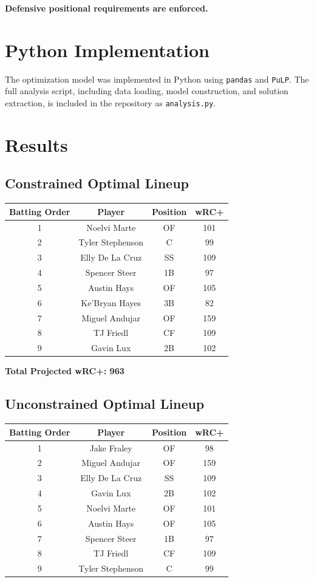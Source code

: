 \documentclass[12pt]{article}
\begin{document}
\textbf{Defensive positional requirements are enforced.}

\section{Python Implementation}

The optimization model was implemented in Python using \texttt{pandas} and \texttt{PuLP}. The full analysis script, including data loading, model construction, and solution extraction, is included in the repository as \texttt{analysis.py}.

\section{Results}

\subsection*{Constrained Optimal Lineup}

\begin{longtable}{cccc}
\toprule
Batting Order & Player & Position & wRC+ \\
\midrule
1 & Noelvi Marte & OF & 101 \\
2 & Tyler Stephenson & C & 99 \\
3 & Elly De La Cruz & SS & 109 \\
4 & Spencer Steer & 1B & 97 \\
5 & Austin Hays & OF & 105 \\
6 & Ke'Bryan Hayes & 3B & 82 \\
7 & Miguel Andujar & OF & 159 \\
8 & TJ Friedl & CF & 109 \\
9 & Gavin Lux & 2B & 102 \\
\bottomrule
\end{longtable}

\textbf{Total Projected wRC+: 963}

\subsection*{Unconstrained Optimal Lineup}

\begin{longtable}{cccc}
\toprule
Batting Order & Player & Position & wRC+ \\
\midrule
1 & Jake Fraley & OF & 98 \\
2 & Miguel Andujar & OF & 159 \\
3 & Elly De La Cruz & SS & 109 \\
4 & Gavin Lux & 2B & 102 \\
5 & Noelvi Marte & OF & 101 \\
6 & Austin Hays & OF & 105 \\
7 & Spencer Steer & 1B & 97 \\
8 & TJ Friedl & CF & 109 \\
9 & Tyler Stephenson & C & 99 \\
\bottomrule
\end{longtable}
\end{document}
